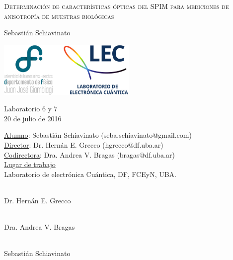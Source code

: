 \documentclass[12pt,a4paper]{article}
\begin{document}
    \begin{titlepage}
        
        \begin{center}
        {\scshape\Huge Determinación de características ópticas del SPIM para mediciones de anisotropía de muestras biológicas \par}
        \vspace{1cm}
        {\Large Sebastián Schiavinato \par}
        \vfill

        \includegraphics[width=0.5\textwidth]{fig/logo}
        
        \vfill
        \Large Laboratorio 6 y 7 \\
        \large 20 de julio de 2016
        \end{center}
        
        \newpage
        \pagestyle{empty}
        \begin{center}
        \large
        \noindent \underline{Alumno}: Sebastián Schiavinato (seba.schiavinato@gmail.com) \\
        \underline{Director}:   Dr. Hernán E. Grecco (hgrecco@df.uba.ar)\\
        \underline{Codirectora}: Dra. Andrea V. Bragas (bragas@df.uba.ar)\\
        \vspace{1em}
        \underline{Lugar de trabajo}\\ Laboratorio de electrónica Cuántica, DF, FCEyN, UBA.
        \end{center}
        \vspace{5em}
        \begin{minipage}{.3\textwidth}
            \begin{flushleft}
            \centering
            \hrulefill\\
            Dr. Hernán E. Grecco 
            \end{flushleft}
        \end{minipage}
        \hfill
        \begin{minipage}{.3\textwidth}
            \begin{center}
            \hrulefill\\
            Dra. Andrea V. Bragas
            \end{center}
        \end{minipage}
        \hfill
        \begin{minipage}{.3\textwidth}
            \begin{flushright}
            \centering
            \hrulefill\\
            Sebastián Schiavinato
            \end{flushright}
        \end{minipage}
    \end{titlepage}
\end{document}
